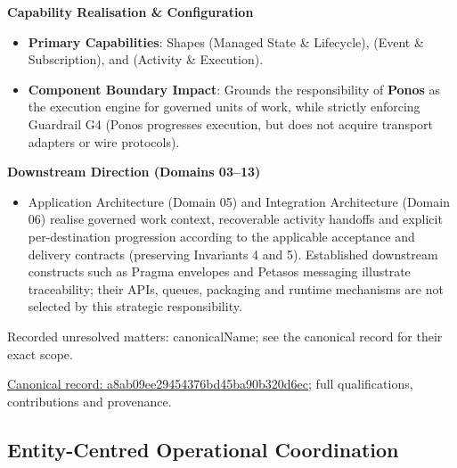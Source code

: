 \par\medskip\textbf{Capability Realisation \& Configuration}\par


\begin{itemize}


\item \textbf{Primary Capabilities}: Shapes \texttt{} (Managed State \& Lifecycle), \texttt{} (Event \& Subscription), and \texttt{} (Activity \& Execution).

\item \textbf{Component Boundary Impact}: Grounds the responsibility of \textbf{Ponos} as the execution engine for governed units of work, while strictly enforcing Guardrail G4 (Ponos progresses execution, but does not acquire transport adapters or wire protocols).

\end{itemize}


\par\medskip\textbf{Downstream Direction (Domains 03–13)}\par


\begin{itemize}


\item Application Architecture (Domain 05) and Integration Architecture (Domain 06) realise governed work context, recoverable activity handoffs and explicit per-destination progression according to the applicable acceptance and delivery contracts (preserving Invariants 4 and 5). Established downstream constructs such as Pragma envelopes and Petasos messaging illustrate traceability; their APIs, queues, packaging and runtime mechanisms are not selected by this strategic responsibility.

\end{itemize}

{\small Recorded unresolved matters: canonicalName; see the canonical record for their exact scope.}\par
{\footnotesize \href{../../../../continuum/strategy/course-of-action/a8ab09ee29454376bd45ba90b320d6ec.md}{Canonical record: a8ab09ee29454376bd45ba90b320d6ec}; full qualifications, contributions and provenance.}\par
\subsection{Entity-Centred Operational Coordination}

